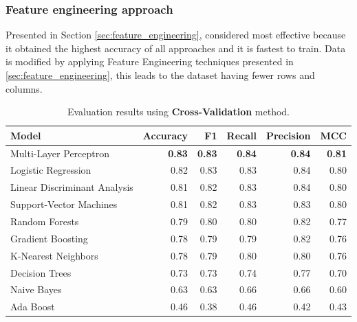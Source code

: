             \subsubsection{Feature engineering approach}
                
                Presented in Section \ref{sec:feature_engineering}, considered most effective because it obtained the highest accuracy of all approaches and it is fastest to train. Data is modified by applying Feature Engineering techniques presented in \ref{sec:feature_engineering}, this leads to the dataset having fewer rows and columns.
            
            \begin{table}[htbp]
                \centering
                \begin{tabular}{lrrrrr}
                    \toprule
                    \textbf{Model} & \textbf{Accuracy} & \textbf{F1} & \textbf{Recall} & \textbf{Precision} & \textbf{MCC} \\
                    \midrule
                    Multi-Layer Perceptron & \textbf{0.83} & \textbf{0.83} & \textbf{0.84} & \textbf{0.84} & \textbf{0.81} \\
                    Logistic Regression & 0.82 & 0.83 & 0.83 & 0.84 & 0.80 \\
                    Linear Discriminant Analysis & 0.81 & 0.82 & 0.83 & 0.84 & 0.80 \\
                    Support-Vector Machines & 0.81 & 0.82 & 0.83 & 0.83 & 0.80 \\
                    Random Forests & 0.79 & 0.80 & 0.80 & 0.82 & 0.77 \\
                    Gradient Boosting & 0.78 & 0.79 & 0.79 & 0.82 & 0.76 \\
                    K-Nearest Neighbors & 0.78 & 0.79 & 0.80 & 0.80 & 0.76 \\
                    Decision Trees & 0.73 & 0.73 & 0.74 & 0.77 & 0.70 \\
                    Naive Bayes & 0.63 & 0.63 & 0.66 & 0.66 & 0.60 \\
                    Ada Boost & 0.46 & 0.38 & 0.46 & 0.42 & 0.43 \\
                    \bottomrule
                \end{tabular}
                \caption{Evaluation results using \textbf{Cross-Validation} method.}
                \label{tab:feature_engineering_approach_cv}
            \end{table}

